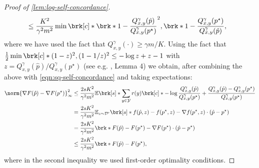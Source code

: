 \documentclass[11pt]{article}
\newcommand{\bbE}{\boldsymbol{\mathbb{E}}}
\renewcommand{\E}{\bbE}
\newcommand{\yprobg}[3]{Q^\gamma_{#2,#3}(#1)}
\newcommand{\rew}{r}
\newcommand{\lab}{y}
\newcommand{\calY}{\mathcal{Y}}
\newcommand{\iwd}{\mathcal{D}'}
\newcommand{\obj}{F}
\newcommand{\objrand}{f}
\theoremstyle{plain}
\begin{document}
\begin{proof}[Proof of \cref{lem:log-self-concordance}]
\begin{align*}
        &\leq \frac{K^2}{\gamma^2 m^2} \min \brk[c]*{\brk*{1 - \frac{\yprobg{\hat p}{x}{\lab}}{\yprobg{p^\star}{x}{\lab}}}^2, \brk*{1 - \frac{\yprobg{p^\star}{x}{\lab}}{\yprobg{\hat p}{x}{\lab}}}}, 
    \end{align*}
    where we have used the fact that $\yprobg{\cdot}{x}{y} \geq \gamma m / K$. Using the fact that $\frac12 \min \brk[c]*{(1-z)^2, (1-1/z)^2} \leq - \log z + z - 1$ with $z =\yprobg{\hat p}{x}{\lab} /  \yprobg{p^\star}{x}{\lab}$ (see e.g. \cite{erez2024fast}, Lemma 4) we obtain, after combining the above with \cref{eqn:sq-self-concordance} and taking expectations:
    \begin{align*}
        \norm{\nabla \obj(\hat p) - \nabla \obj(p^\star)}^2_\infty
        &\leq
        \frac{2 s K^2}{\gamma^2 m^2} \E \brk[s]*{\sum_{\lab \in \calY} \rew(\lab) \brk[c]*{- \log \frac{\yprobg{\hat p}{x}{\lab}}{\yprobg{p^\star}{x}{\lab}} + \frac{\yprobg{\hat p}{x}{\lab} - \yprobg{p^\star}{x}{\lab}}{\yprobg{p^\star}{x}{\lab}}}} \\
        &=
        \frac{2 s K^2}{\gamma^2 m^2} \E_{z \sim \iwd} \brk[s]*{\objrand(\hat p, z) - \objrand(p^\star,z) - \nabla \objrand(p^\star,z) \cdot (\hat p - p^\star)} \\
        &=
        \frac{2 s K^2}{\gamma^2 m^2} \brk*{\obj(\hat p) - \obj(p^\star) - \nabla \obj(p^\star) \cdot (\hat p - p^\star)} \\
        &\leq
        \frac{2 s K^2}{\gamma^2 m^2} \brk*{\obj(\hat p) - \obj(p^\star)},
    \end{align*}
    where in the second inequality we used first-order optimality conditions.
\end{proof}
\end{document}
